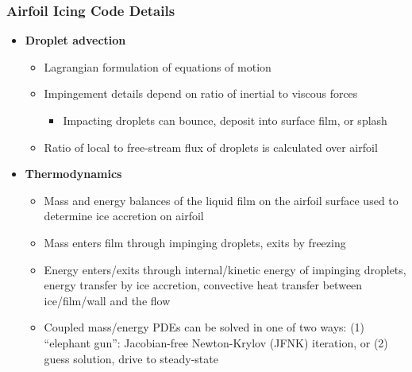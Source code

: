 \documentclass[9pt]{beamer}
\begin{document}
\begin{frame}
\frametitle{Airfoil Icing Code Details}
\label{sec-3-6}

\begin{itemize}
\item \textbf{Droplet advection}
\begin{itemize}
\item Lagrangian formulation of equations of motion
\item Impingement details depend on ratio of inertial to viscous forces
\begin{itemize}
\item Impacting droplets can bounce, deposit into surface film, or splash
\end{itemize}
\item Ratio of local to free-stream flux of droplets is calculated over airfoil
\end{itemize}
\item \textbf{Thermodynamics}
\begin{itemize}
\item Mass and energy balances of the liquid film on the airfoil surface
    used to determine ice accretion on airfoil
\item Mass enters film through impinging droplets, exits by freezing
\item Energy enters/exits through internal/kinetic energy of impinging
    droplets, energy transfer by ice accretion, convective
    heat transfer between ice/film/wall and the flow
\item Coupled mass/energy PDEs can be solved in one of two ways: (1)
    ``elephant gun'': Jacobian-free Newton-Krylov (JFNK) iteration, or
    (2) guess solution, drive to steady-state
\end{itemize}
\end{itemize}
\end{frame}
\end{document}
